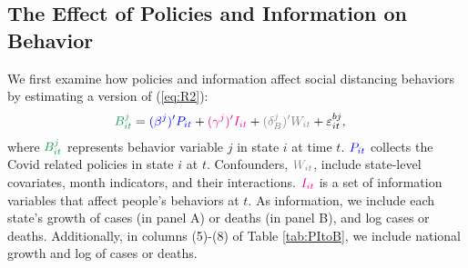 \documentclass[11pt,reqno,letter]{amsart}
\theoremstyle{definition}
\def\bcolor{\color{ForestGreen}}
\def\pcolor{\color{blue}}
\def\icolor{\color{magenta}}
\def\wcolor{\color{gray}}
\begin{document}
\subsection{The Effect of Policies and Information on Behavior\label{policies-and-behavior}}

We first examine how policies and information affect social distancing behaviors by estimating a version of (\ref{eq:R2}):
\begin{align}
  {\bcolor B_{it}^j}
  & = {\pcolor (\beta^j)' P_{it}} + {\icolor (\gamma^j)' I_{it}} +
    {\wcolor (\delta_B^j)' W_{it}} + \varepsilon_{it}^{bj}, \notag
\end{align}
where ${\bcolor B_{it}^j}$ represents behavior variable $j$  in state  $i$ at time $t$.
${\pcolor P_{it}}$ collects the Covid related policies  in state $i$ at $t$.
Confounders, ${\wcolor W_{it}}$, include state-level covariates, month
indicators, and their interactions.
${\icolor I_{it}}$ is a set of information variables that affect
people's behaviors at $t$. As information, we include each state's
growth of cases (in panel A) or deaths (in panel B), and log cases or deaths.  Additionally, in
columns (5)-(8) of Table \ref{tab:PItoB}, we include national growth and log
of cases or deaths.
\end{document}
